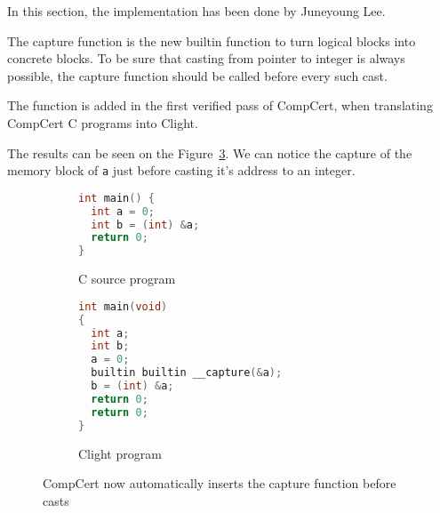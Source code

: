 \label{sec:capturesem}

In this section, the implementation has been done by Juneyoung Lee.

The capture function is the new builtin function to turn logical blocks into concrete blocks.
To be sure that casting from pointer to integer is always possible, the capture function should be called before every such cast.

The function is added in the first verified pass of CompCert, when translating CompCert C programs into Clight.

The results can be seen on the Figure~\ref{fig:captureexample}. We can notice the capture of the memory block of \texttt{a} just before casting it's address to an integer.

\begin{figure}[H]
\begin{subfigure}{.48\textwidth}
  \begin{lstlisting}[language=C]
int main() {
  int a = 0;
  int b = (int) &a;
  return 0;
}
  \end{lstlisting}
  \caption{C source program}
  \label{fig:capturec}
\end{subfigure}
\begin{subfigure}{.48\textwidth}
  \begin{lstlisting}[language=C]
int main(void)
{
  int a;
  int b;
  a = 0;
  builtin builtin __capture(&a);
  b = (int) &a;
  return 0;
  return 0;
}
  \end{lstlisting}
  \caption{Clight program}
  \label{fig:captureclight}
\end{subfigure}
\caption{CompCert now automatically inserts the capture function before casts}
\label{fig:captureexample}
\end{figure}
